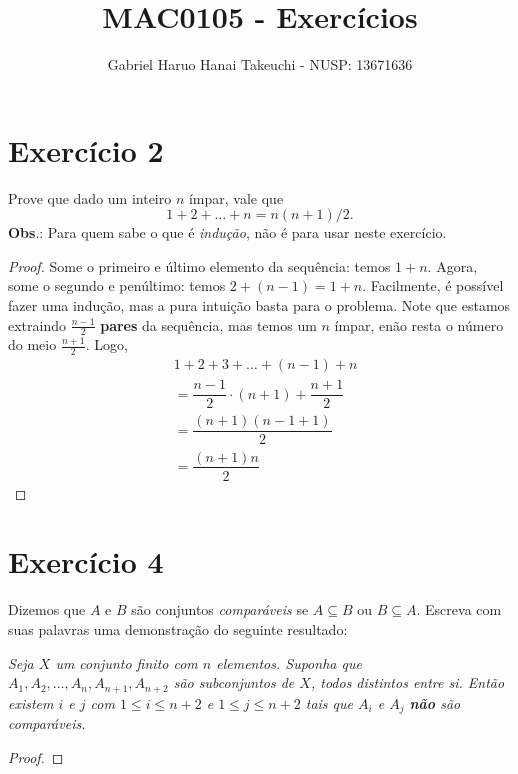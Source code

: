 \documentclass{article}
\author{Gabriel Haruo Hanai Takeuchi - NUSP: 13671636}
\title{MAC0105 - Exercícios}
\date{}
\begin{document}
\maketitle

\section*{Exercício 2}
Prove que dado um inteiro $n$ ímpar, vale que
\[
1+2+\dots+n = n(n+1)/2.
\]
\textbf{Obs}.: Para quem sabe o que é \textit{indução}, não é para
usar neste exercício.

\hrulefill

\begin{proof}
Some o primeiro e último elemento da sequência: temos $1 + n$.
Agora, some o segundo e penúltimo: temos $2 + (n-1) = 1 + n$.
Facilmente, é possível fazer uma indução, mas a pura intuição basta para o problema.
Note que estamos extraindo $\frac{n-1}{2}$ \textbf{pares} da sequência, mas temos um $n$ ímpar, enão resta o número do meio $\frac{n+1}{2}$.
Logo,
\begin{align*}
&1 + 2 + 3 + \dots + (n-1) + n \\
&= \dfrac{n-1}{2} \cdot (n+1) + \dfrac{n+1}{2} \\
&= \dfrac{(n+1)(n-1 + 1)}{2} \\
&= \dfrac{(n+1)n}{2}
\end{align*}
\end{proof}

\section*{Exercício 4}

Dizemos que $A$ e $B$ são conjuntos \emph{comparáveis} se $A\subseteq B$ ou $B\subseteq A$.
Escreva com suas palavras uma demonstração do seguinte resultado:

\textit{Seja $X$ um conjunto finito com $n$ elementos.
Suponha que $A_1,A_2,\dots,A_n,A_{n+1},A_{n+2}$ são subconjuntos de $X$, todos
distintos entre si.
Então existem $i$ e $j$ com $1\leq i\leq n+2$ e $1\leq j\leq n+2$ tais que $A_i$ e $A_j$ \textbf{não} são comparáveis.}

\begin{proof}

\end{proof}
\end{document}

